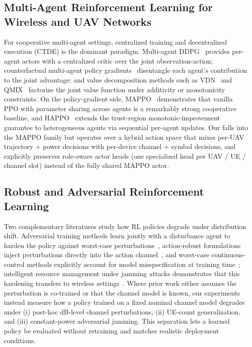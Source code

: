 \subsection{Multi-Agent Reinforcement Learning for Wireless and UAV
Networks}\label{subsec:rw:marl}
For cooperative multi-agent settings, centralized training and
decentralized execution (CTDE) is the dominant paradigm. Multi-agent
DDPG~\cite{lowe2017maddpg} provides per-agent actors with a centralized
critic over the joint observation-action; counterfactual multi-agent
policy gradients~\cite{foerster2018coma} disentangle each agent's
contribution to the joint advantage; and value decomposition methods such
as VDN~\cite{sunehag2018vdn} and QMIX~\cite{rashid2018qmix} factorize
the joint value function under additivity or monotonicity constraints. On the policy-gradient side,
MAPPO~\cite{yu2022mappo} demonstrates that vanilla PPO with parameter
sharing across agents is a remarkably strong cooperative baseline, and
HAPPO~\cite{kuba2022happo} extends the trust-region monotonic-improvement
guarantee to heterogeneous agents via sequential per-agent updates. Our
\method falls into the MAPPO family but operates over a hybrid action
space that mixes per-UAV trajectory + power decisions with per-device
channel + symbol decisions, and explicitly preserves role-aware actor
heads (one specialized head per UAV / UE / channel slot) instead of the
fully shared MAPPO actor.

\subsection{Robust and Adversarial Reinforcement
Learning}\label{subsec:rw:robust}
Two complementary literatures study how RL policies degrade under
distribution shift. Adversarial training methods learn jointly with a
disturbance agent to harden the policy against worst-case
perturbations~\cite{pinto2017robustrl}, action-robust formulations
inject perturbations directly into the action
channel~\cite{tessler2019actionrobust}, and worst-case continuous-control
methods explicitly account for model misspecification at training
time~\cite{mankowitz2020worstcase}; intelligent resource management
under jamming attacks demonstrates that this hardening transfers to
wireless settings~\cite{liu2024jamminguav}. Where prior work either
assumes the perturbation is co-trained or that the channel model is
known, our experiments instead measure how a policy trained on a fixed
nominal channel model degrades under (i) post-hoc dB-level channel
perturbations, (ii) UE-count generalization, and (iii) constant-power
adversarial jamming. This separation lets a learned policy be evaluated
without retraining and matches realistic deployment conditions.

